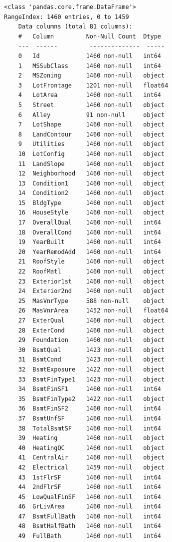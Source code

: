 \begin{lstlisting}
<class 'pandas.core.frame.DataFrame'>
RangeIndex: 1460 entries, 0 to 1459
    Data columns (total 81 columns):
    #   Column         Non-Null Count  Dtype  
    ---  ------         --------------  -----  
    0   Id             1460 non-null   int64  
    1   MSSubClass     1460 non-null   int64  
    2   MSZoning       1460 non-null   object 
    3   LotFrontage    1201 non-null   float64
    4   LotArea        1460 non-null   int64  
    5   Street         1460 non-null   object 
    6   Alley          91 non-null     object 
    7   LotShape       1460 non-null   object 
    8   LandContour    1460 non-null   object 
    9   Utilities      1460 non-null   object 
    10  LotConfig      1460 non-null   object 
    11  LandSlope      1460 non-null   object 
    12  Neighborhood   1460 non-null   object 
    13  Condition1     1460 non-null   object 
    14  Condition2     1460 non-null   object 
    15  BldgType       1460 non-null   object 
    16  HouseStyle     1460 non-null   object 
    17  OverallQual    1460 non-null   int64  
    18  OverallCond    1460 non-null   int64  
    19  YearBuilt      1460 non-null   int64  
    20  YearRemodAdd   1460 non-null   int64  
    21  RoofStyle      1460 non-null   object 
    22  RoofMatl       1460 non-null   object 
    23  Exterior1st    1460 non-null   object 
    24  Exterior2nd    1460 non-null   object 
    25  MasVnrType     588 non-null    object 
    26  MasVnrArea     1452 non-null   float64
    27  ExterQual      1460 non-null   object 
    28  ExterCond      1460 non-null   object 
    29  Foundation     1460 non-null   object 
    30  BsmtQual       1423 non-null   object 
    31  BsmtCond       1423 non-null   object 
    32  BsmtExposure   1422 non-null   object 
    33  BsmtFinType1   1423 non-null   object 
    34  BsmtFinSF1     1460 non-null   int64  
    35  BsmtFinType2   1422 non-null   object 
    36  BsmtFinSF2     1460 non-null   int64  
    37  BsmtUnfSF      1460 non-null   int64  
    38  TotalBsmtSF    1460 non-null   int64  
    39  Heating        1460 non-null   object 
    40  HeatingQC      1460 non-null   object 
    41  CentralAir     1460 non-null   object 
    42  Electrical     1459 non-null   object 
    43  1stFlrSF       1460 non-null   int64  
    44  2ndFlrSF       1460 non-null   int64  
    45  LowQualFinSF   1460 non-null   int64  
    46  GrLivArea      1460 non-null   int64  
    47  BsmtFullBath   1460 non-null   int64  
    48  BsmtHalfBath   1460 non-null   int64  
    49  FullBath       1460 non-null   int64  

\end{lstlisting}
